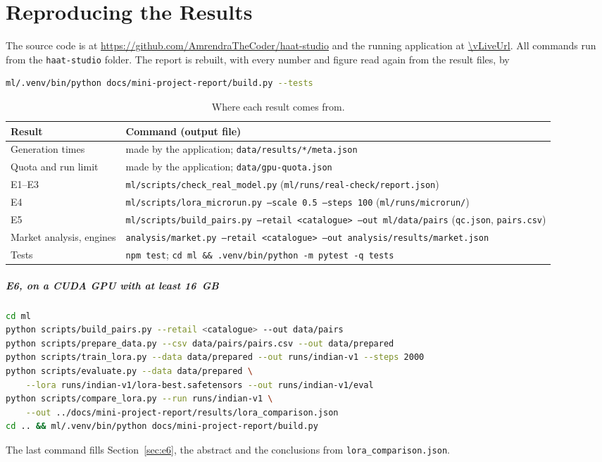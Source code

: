 \chapter{Reproducing the Results}

The source code is at \url{https://github.com/AmrendraTheCoder/haat-studio}\ifLive{} and the running application at \url{\vLiveUrl}\fi. All commands run from the \texttt{haat-studio} folder. The report is rebuilt, with every number and figure read again from the result files, by
\begin{lstlisting}[language=bash,numbers=none]
ml/.venv/bin/python docs/mini-project-report/build.py --tests
\end{lstlisting}

\begin{table}[!htbp]
\centering
\caption{Where each result comes from.}
\label{tab:repro}
\small
\begin{tabularx}{\linewidth}{@{}L{42mm}Y@{}}
\toprule
\textbf{Result} & \textbf{Command (output file)}\\
\midrule
Generation times & made by the application; \texttt{data/results/*/meta.json}\\
Quota and run limit & made by the application; \texttt{data/gpu-quota.json}\\
E1--E3 & \texttt{ml/scripts/check\_real\_model.py} (\texttt{ml/runs/real-check/report.json})\\
E4 & \texttt{ml/scripts/lora\_microrun.py --scale 0.5 --steps 100} (\texttt{ml/runs/microrun/})\\
E5 & \texttt{ml/scripts/build\_pairs.py --retail <catalogue> --out ml/data/pairs} (\texttt{qc.json}, \texttt{pairs.csv})\\
Market analysis, engines & \texttt{analysis/market.py --retail <catalogue> --out analysis/results/market.json}\\
Tests & \texttt{npm test}; \texttt{cd ml \&\& .venv/bin/python -m pytest -q tests}\\
\bottomrule
\end{tabularx}
\end{table}

\paragraph{E6, on a CUDA GPU with at least 16~GB}
\begin{lstlisting}[language=bash,numbers=none]
cd ml
python scripts/build_pairs.py --retail <catalogue> --out data/pairs
python scripts/prepare_data.py --csv data/pairs/pairs.csv --out data/prepared
python scripts/train_lora.py --data data/prepared --out runs/indian-v1 --steps 2000
python scripts/evaluate.py --data data/prepared \
    --lora runs/indian-v1/lora-best.safetensors --out runs/indian-v1/eval
python scripts/compare_lora.py --run runs/indian-v1 \
    --out ../docs/mini-project-report/results/lora_comparison.json
cd .. && ml/.venv/bin/python docs/mini-project-report/build.py
\end{lstlisting}
\noindent The last command fills Section~\ref{sec:e6}, the abstract and the conclusions from \texttt{lora\_\allowbreak comparison.json}.

